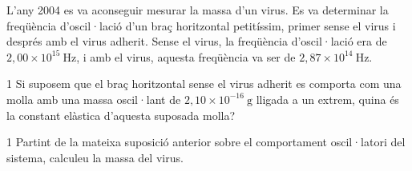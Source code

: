 L'any 2004 es va aconseguir mesurar la massa d'un virus. Es va determinar la freqüència d'oscil·lació d'un braç horitzontal petitíssim, primer sense el virus i després amb el virus adherit. Sense el virus, la freqüència d'oscil·lació era de $2,00\times 10^{15}\ \mathrm{Hz}$, i amb el virus, aquesta freqüència va ser de $2,87\times 10^{14}\ \mathrm{Hz}$.

\begin{apartat}{1}
Si suposem que el braç horitzontal sense el virus adherit es comporta com una molla amb una massa oscil·lant de $2,10\times 10^{-16}\ \mathrm{g}$ lligada a un extrem, quina és la constant elàstica d'aquesta suposada molla?
\end{apartat}

\begin{apartat}{1}
Partint de la mateixa suposició anterior sobre el comportament oscil·latori del sistema, calculeu la massa del virus.
\end{apartat}
